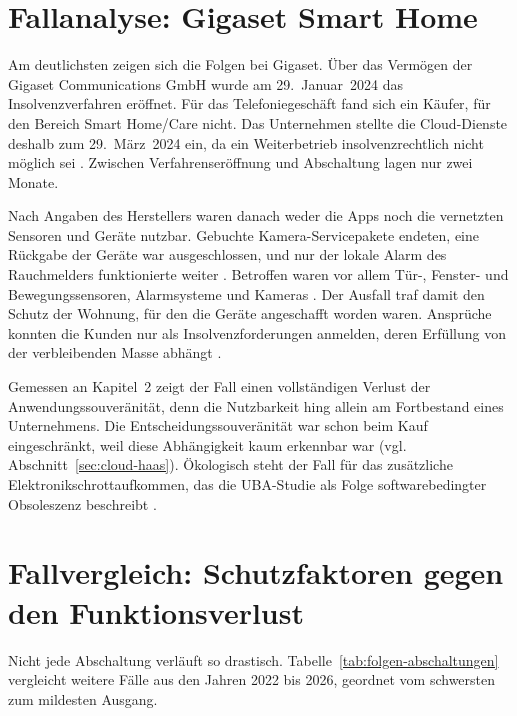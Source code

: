 \section{Fallanalyse: Gigaset Smart Home}\label{sec:folgen-gigaset}

Am deutlichsten zeigen sich die Folgen bei Gigaset. Über das Vermögen der
Gigaset Communications GmbH wurde am 29.~Januar~2024 das Insolvenzverfahren
eröffnet. Für das Telefoniegeschäft fand sich ein Käufer, für den Bereich
Smart Home/Care nicht. Das Unternehmen stellte die Cloud-Dienste deshalb zum
29.~März~2024 ein, da ein Weiterbetrieb insolvenzrechtlich nicht möglich sei
\autocite[vgl.][]{gigaset:2024b}. Zwischen Verfahrenseröffnung und
Abschaltung lagen nur zwei Monate.

Nach Angaben des Herstellers waren danach weder die Apps noch die vernetzten
Sensoren und Geräte nutzbar. Gebuchte Kamera-Servicepakete endeten, eine
Rückgabe der Geräte war ausgeschlossen, und nur der lokale Alarm des
Rauchmelders funktionierte weiter \autocite[vgl.][]{gigaset:2024a}. Betroffen
waren vor allem Tür-, Fenster- und Bewegungssensoren, Alarmsysteme und
Kameras \autocite[vgl.][]{wittkowski:2024}. Der Ausfall traf damit den Schutz
der Wohnung, für den die Geräte angeschafft worden waren. Ansprüche konnten
die Kunden nur als Insolvenzforderungen anmelden, deren Erfüllung von der
verbleibenden Masse abhängt \autocite[vgl.][]{teltarif:2024}.

Gemessen an Kapitel~2 zeigt der Fall einen vollständigen Verlust der
Anwendungssouveränität, denn die Nutzbarkeit hing allein am Fortbestand eines
Unternehmens. Die Entscheidungssouveränität war schon beim Kauf
eingeschränkt, weil diese Abhängigkeit kaum erkennbar war
(vgl. Abschnitt~\ref{sec:cloud-haas}). Ökologisch steht der Fall für das
zusätzliche Elektronikschrottaufkommen, das die \acrshort{UBA}-Studie als
Folge softwarebedingter Obsoleszenz beschreibt
\autocite[vgl.][S.~18]{jaegererben:2023}.

\section{Fallvergleich: Schutzfaktoren gegen den Funktionsverlust}\label{sec:folgen-vergleich}

Nicht jede Abschaltung verläuft so drastisch.
Tabelle~\ref{tab:folgen-abschaltungen} vergleicht weitere Fälle aus den
Jahren 2022 bis 2026, geordnet vom schwersten zum mildesten Ausgang.

